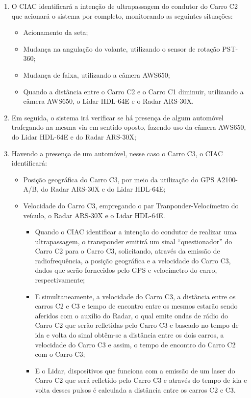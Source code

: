 \begin{enumerate}
  \item O CIAC identificará a intenção de ultrapassagem do condutor do Carro
  C2 que acionará o sistema por completo, monitorando as seguintes situações:
  \begin{itemize}
    \item Acionamento da seta;
    \item Mudança na angulação do volante, utilizando o sensor de rotação PST-360;
    \item Mudança de faixa, utilizando a câmera AWS650;
    \item Quando a distância entre o Carro C2 e o Carro C1 diminuir, utilizando a
    câmera AWS650, o Lidar HDL-64E e o Radar ARS-30X.
  \end{itemize}

  \item Em seguida, o sistema irá verificar se há presença de algum automóvel
  trafegando na mesma via em sentido oposto, fazendo uso da câmera AWS650, do
  Lidar HDL-64E e do Radar ARS-30X;

  \item Havendo a presença de um automóvel, nesse caso o Carro C3, o CIAC identificará:
  \begin{itemize}
    \item Posição geográfica do Carro C3, por meio da utilização do GPS
    A2100-A/B, do Radar ARS-30X e do Lidar HDL-64E;

    \item Velocidade do Carro C3, empregando o par Tranponder-Velocímetro do
    veículo, o Radar ARS-30X e o Lidar HDL-64E.
    \begin{itemize}
      \item Quando o CIAC identificar a intenção do condutor de realizar uma
      ultrapassagem, o transponder emitirá um sinal “questionador” do Carro C2
      para o Carro C3, solicitando, através da emissão de radiofrequência, a
      posição geográfica e a velocidade do Carro C3, dados que serão fornecidos
      pelo GPS e velocímetro do carro, respectivamente;

      \item E simultaneamente, a velocidade do Carro C3, a distância entre os
      carros C2 e C3 e tempo de encontro entre os mesmos estarão sendo aferidos
      com o auxílio do Radar, o qual emite ondas de rádio do Carro C2 que serão
      refletidas pelo Carro C3 e baseado no tempo de ida e volta do sinal
      obtêm-se a distância entre os dois carros, a velocidade do Carro C3 e
      assim, o tempo de encontro do Carro C2 com o Carro C3;

      \item E o Lidar, dispositivos que funciona com a emissão de um laser do
      Carro C2 que será refletido pelo Carro C3 e através do tempo de ida e
      volta desses pulsos é calculada a distância entre os carros C2 e C3.

    \end{itemize}
  \end{itemize}
\end{enumerate}
